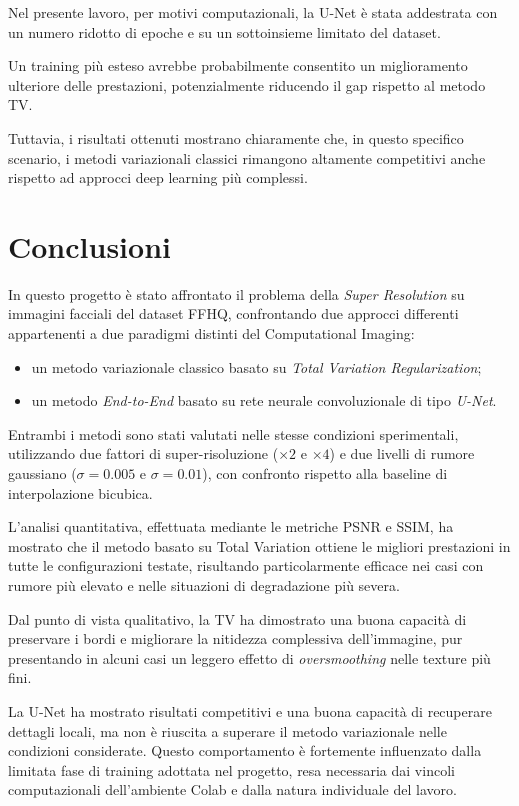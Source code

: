 \documentclass{article}
\begin{document}
Nel presente lavoro, per motivi computazionali, la U-Net è stata addestrata con un numero ridotto di epoche e su un sottoinsieme limitato del dataset.

Un training più esteso avrebbe probabilmente consentito un miglioramento ulteriore delle prestazioni, potenzialmente riducendo il gap rispetto al metodo TV.

Tuttavia, i risultati ottenuti mostrano chiaramente che, in questo specifico scenario, i metodi variazionali classici rimangono altamente competitivi anche rispetto ad approcci deep learning più complessi.

\newpage
\section{Conclusioni}

In questo progetto è stato affrontato il problema della \textit{Super Resolution} su immagini facciali del dataset FFHQ, confrontando due approcci differenti appartenenti a due paradigmi distinti del Computational Imaging:

\begin{itemize}
    \item un metodo variazionale classico basato su \textit{Total Variation Regularization};
    \item un metodo \textit{End-to-End} basato su rete neurale convoluzionale di tipo \textit{U-Net}.
\end{itemize}

Entrambi i metodi sono stati valutati nelle stesse condizioni sperimentali, utilizzando due fattori di super-risoluzione (\(\times 2\) e \(\times 4\)) e due livelli di rumore gaussiano (\(\sigma = 0.005\) e \(\sigma = 0.01\)), con confronto rispetto alla baseline di interpolazione bicubica.

L’analisi quantitativa, effettuata mediante le metriche PSNR e SSIM, ha mostrato che il metodo basato su Total Variation ottiene le migliori prestazioni in tutte le configurazioni testate, risultando particolarmente efficace nei casi con rumore più elevato e nelle situazioni di degradazione più severa.

Dal punto di vista qualitativo, la TV ha dimostrato una buona capacità di preservare i bordi e migliorare la nitidezza complessiva dell’immagine, pur presentando in alcuni casi un leggero effetto di \textit{oversmoothing} nelle texture più fini.

La U-Net ha mostrato risultati competitivi e una buona capacità di recuperare dettagli locali, ma non è riuscita a superare il metodo variazionale nelle condizioni considerate. Questo comportamento è fortemente influenzato dalla limitata fase di training adottata nel progetto, resa necessaria dai vincoli computazionali dell’ambiente Colab e dalla natura individuale del lavoro.
\end{document}
